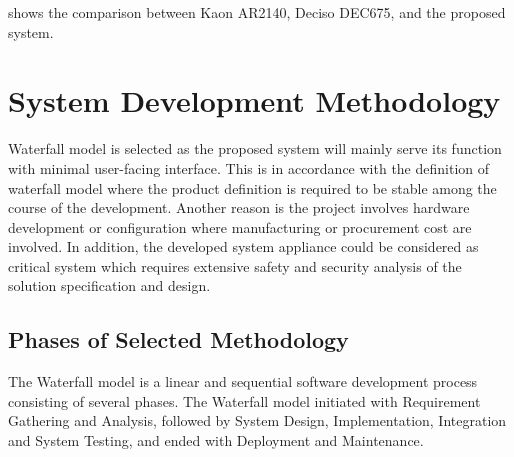 \documentclass[conference]{IEEEtran}
\begin{document}
 shows the comparison between Kaon AR2140, Deciso DEC675, and
the proposed system.

\section{System Development Methodology}

Waterfall model is selected as the proposed system will mainly serve its function with minimal
user-facing interface. This is in accordance with the definition of waterfall model where the
product definition is required to be stable among the course of the development. Another reason is
the project involves hardware development or configuration where manufacturing or procurement cost
are involved. In addition, the developed system appliance could be considered as critical system
which requires extensive safety and security analysis of the solution specification and design.

\subsection{Phases of Selected Methodology}

The Waterfall model is a linear and sequential software development process consisting of several
phases. The Waterfall model initiated with Requirement Gathering and Analysis, followed by System
Design, Implementation, Integration and System Testing, and ended with Deployment and Maintenance.
\end{document}
